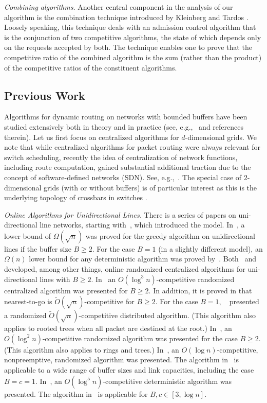 \documentclass[11pt]{article}
\newenvironment{proof sketch}[1]{\noindent {\emph{Proof sketch of #1:}}}{\hfill \qed}
\begin{document}
\emph{Combining algorithms.} Another central component in the analysis of our
algorithm is the combination technique introduced by Kleinberg and Tardos \cite{KT}.
Loosely speaking, this technique deals with an admission control algorithm that is
the conjunction of two competitive algorithms, the state of which depends only on the
requests accepted by both. The technique enables one to prove that the competitive
ratio of the combined algorithm is the sum (rather than the product) of the
competitive ratios of the constituent algorithms.



\subsection{Previous Work}
Algorithms for dynamic routing on networks with bounded
buffers have been studied extensively both in theory and in practice
(see, e.g.,~\cite{AKRR} and references therein).
Let us first focus on centralized algorithms for $d$-dimensional grids.
We note that while centralized algorithms for packet routing were
always relevant for switch scheduling, recently the idea of centralization of
network functions, including route computation, gained substantial
additional traction due to
the concept of software-defined networks (SDN). See, e.g.,~\cite{nox}.
 The special case of $2$-dimensional grids (with or without
buffers) is of particular interest as this is the underlying
topology of crossbars in switches \cite{T}.


\emph{Online Algorithms for Unidirectional Lines.}
There is a series of papers on uni-directional line
networks, starting with~\cite{AKOR}, which introduced the
model. In~\cite{AKOR}, a lower bound of $\Omega(\sqrt{n})$
was proved for the greedy algorithm on unidirectional lines
if the buffer size $B\ge2$.  For the case $B=1$ (in a
slightly different model), an $\Omega(n)$ lower bound for
any deterministic algorithm was proved by~\cite{AZ,AKK}.
Both~\cite{AZ} and~\cite{AKK} developed, among other
things, online randomized centralized algorithms for
uni-directional lines with $B\geq 2$. In~\cite{AKK} an
$O(\log^3 n)$-competitive randomized centralized algorithm
was presented for $B\ge2$.  In addition,  it is proved in \cite{AKK}
that nearest-to-go is
$\tilde{O}(\sqrt{n})$-competitive for $B\geq 2$.  For the case $B=1$,
~\cite{AKK} presented a randomized
$\tilde{O}(\sqrt{n})$-competitive distributed algorithm.
(This algorithm also applies to rooted trees when all
packet are destined at the root.) In~\cite{AZ}, an
$O(\log^2 n)$-competitive randomized algorithm was
presented for the case $B\geq 2$.  (This algorithm also
applies to rings and trees.)
In~\cite{DBLP:conf/icalp/EvenM10}, an $O(\log n)$-competitive,
nonpreemptive, randomized algorithm was presented. The algorithm
in~\cite{DBLP:conf/icalp/EvenM10} is applicable to a wide range of
buffer sizes and link capacities, including the case $B=c=1$.  In~\cite{DBLP:conf/spaa/EvenM11}, an $O(\log^5
n)$-competitive deterministic algorithm was
presented. The algorithm in~\cite{DBLP:conf/spaa/EvenM11} is
applicable for $B,c \in [3,\log n]$.
\end{document}
